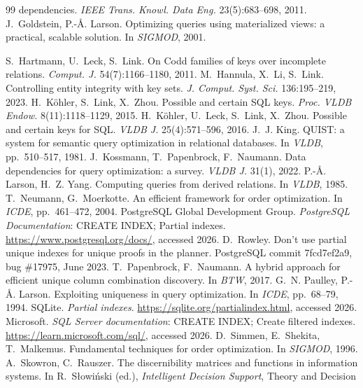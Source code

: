 \documentclass[conference]{IEEEtran}
\theoremstyle{definition}
\newif\ifextended
\begin{document}
\begin{thebibliography}{99}
  dependencies. \emph{IEEE Trans. Knowl. Data Eng.} 23(5):683--698, 2011.
 J.~Goldstein, P.-{\AA}. Larson. Optimizing queries using materialized views: a
  practical, scalable solution. In \emph{SIGMOD}, 2001.
\ifextended
\bibitem{GGZ01} P.~Godfrey, J.~Gryz, C.~Zuzarte. Exploiting constraint-like data
  characterizations in query optimization. In \emph{SIGMOD}, 2001.
\fi
{} S.~Hartmann, U.~Leck, S.~Link. On Codd families of keys over incomplete
  relations. \emph{Comput. J.} 54(7):1166--1180, 2011.
 M.~Hannula, X.~Li, S.~Link. Controlling entity integrity with key sets.
  \emph{J. Comput. Syst. Sci.} 136:195--219, 2023.
 H.~K\"ohler, S.~Link, X.~Zhou. Possible and certain SQL keys. \emph{Proc.
  VLDB Endow.} 8(11):1118--1129, 2015.
 H.~K\"ohler, U.~Leck, S.~Link, X.~Zhou. Possible and certain keys for SQL.
  \emph{VLDB J.} 25(4):571--596, 2016.
 J.~J. King. QUIST: a system for semantic query optimization in relational
databases. In \emph{VLDB}, pp.~510--517, 1981.
 J.~Kossmann, T.~Papenbrock, F.~Naumann. Data dependencies for query
  optimization: a survey. \emph{VLDB J.} 31(1), 2022.
 P.-{\AA}. Larson, H.~Z. Yang. Computing queries from derived relations. In
  \emph{VLDB}, 1985.
 T.~Neumann, G.~Moerkotte. An efficient framework for order optimization. In
\emph{ICDE}, pp.~461--472, 2004.
 PostgreSQL Global Development Group. \emph{PostgreSQL Documentation}:
  CREATE INDEX; Partial indexes. \url{https://www.postgresql.org/docs/}, accessed 2026.
 D.~Rowley. Don't use partial unique indexes for unique proofs in the
  planner. PostgreSQL commit 7fcd7ef2a9, bug \#17975, June 2023.
 T.~Papenbrock, F.~Naumann. A hybrid approach for efficient unique column
  combination discovery. In \emph{BTW}, 2017.
 G.~N. Paulley, P.-{\AA}. Larson. Exploiting uniqueness in query
  optimization. In \emph{ICDE}, pp.~68--79, 1994.
 SQLite. \emph{Partial indexes}. \url{https://sqlite.org/partialindex.html},
  accessed 2026.
 Microsoft. \emph{SQL Server documentation}: CREATE INDEX; Create
  filtered indexes. \url{https://learn.microsoft.com/sql/}, accessed 2026.
 D.~Simmen, E.~Shekita, T.~Malkemus. Fundamental techniques for order
  optimization. In \emph{SIGMOD}, 1996.
\ifextended
{} A.~Skowron, C.~Rauszer. The discernibility matrices and functions in information
  systems. In R.~S{\l}owi\'nski (ed.), \emph{Intelligent Decision Support}, Theory and Decision

\end{thebibliography}
\end{document}
